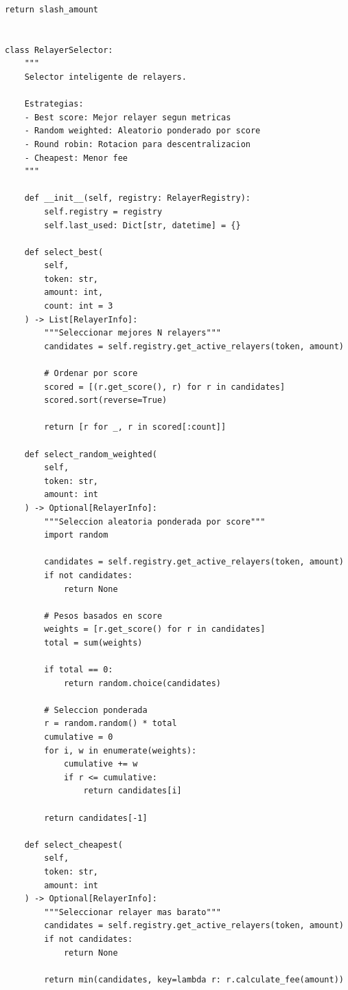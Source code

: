 \documentclass[11pt,a4paper,twoside]{book}
\theoremstyle{definition}
\theoremstyle{remark}
\begin{document}
\begin{lstlisting}[style=python, caption={Sistema de relayers descentralizado}]
        return slash_amount


class RelayerSelector:
    """
    Selector inteligente de relayers.
    
    Estrategias:
    - Best score: Mejor relayer segun metricas
    - Random weighted: Aleatorio ponderado por score
    - Round robin: Rotacion para descentralizacion
    - Cheapest: Menor fee
    """
    
    def __init__(self, registry: RelayerRegistry):
        self.registry = registry
        self.last_used: Dict[str, datetime] = {}
        
    def select_best(
        self,
        token: str,
        amount: int,
        count: int = 3
    ) -> List[RelayerInfo]:
        """Seleccionar mejores N relayers"""
        candidates = self.registry.get_active_relayers(token, amount)
        
        # Ordenar por score
        scored = [(r.get_score(), r) for r in candidates]
        scored.sort(reverse=True)
        
        return [r for _, r in scored[:count]]
    
    def select_random_weighted(
        self,
        token: str,
        amount: int
    ) -> Optional[RelayerInfo]:
        """Seleccion aleatoria ponderada por score"""
        import random
        
        candidates = self.registry.get_active_relayers(token, amount)
        if not candidates:
            return None
        
        # Pesos basados en score
        weights = [r.get_score() for r in candidates]
        total = sum(weights)
        
        if total == 0:
            return random.choice(candidates)
        
        # Seleccion ponderada
        r = random.random() * total
        cumulative = 0
        for i, w in enumerate(weights):
            cumulative += w
            if r <= cumulative:
                return candidates[i]
        
        return candidates[-1]
    
    def select_cheapest(
        self,
        token: str,
        amount: int
    ) -> Optional[RelayerInfo]:
        """Seleccionar relayer mas barato"""
        candidates = self.registry.get_active_relayers(token, amount)
        if not candidates:
            return None
        
        return min(candidates, key=lambda r: r.calculate_fee(amount))



\end{lstlisting}
\end{document}
